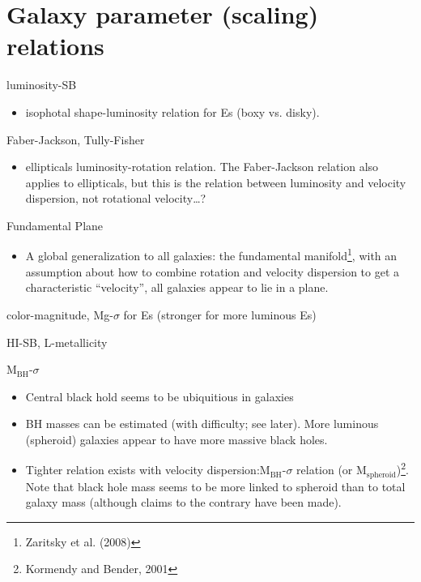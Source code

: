 \documentclass{article}
\newcommand{\mynotes}[1]{\textcolor{cadmiumorange}{#1}}
\begin{document}
\section{Galaxy parameter (scaling) relations}
\begin{description}[labelindent=0.2in]
    \item [Structural] luminosity-SB
        \begin{itemize}
            \item isophotal shape-luminosity relation for Es
                (boxy vs. disky).
        \end{itemize}
    \item [Kinematic] Faber-Jackson, Tully-Fisher
        \begin{itemize}
            \item ellipticals luminosity-rotation relation.
                \mynotes{The Faber-Jackson relation also applies to
                ellipticals, but this is the relation between luminosity
                and velocity dispersion, not rotational velocity\ldots?}
        \end{itemize}
    \item [Structural/kinematic] Fundamental Plane
        \begin{itemize}
            \item A global generalization to all galaxies: the fundamental
                manifold\footnote{Zaritsky et al. (2008)}, with an
                assumption about how to combine rotation and velocity
                dispersion to get a characteristic ``velocity'', all galaxies
                appear to lie in a plane.
        \end{itemize}
    \item [Stellar populations] color-magnitude, Mg-$\sigma$ for Es
        (stronger for more luminous Es)
    \item [Gas] HI-SB, L-metallicity
    \item [Black holes] M$_{\mathrm{BH}}$-$\sigma$
        \begin{itemize}
            \item Central black hold seems to be ubiquitious in galaxies
            \item BH masses can be estimated (with difficulty; see later).
                More luminous (spheroid) galaxies appear to have more
                massive black holes.
            \item Tighter relation exists with velocity
                dispersion:M$_{\mathrm{BH}}$-$\sigma$ relation
                (or M$_{\mathrm{spheroid}}$)\footnote{Kormendy and
                Bender, 2001}. Note that black hole mass seems to be
                more linked to spheroid than to total galaxy mass
                (although claims to the contrary have been made).
        \end{itemize}
\end{description}
\end{document}
